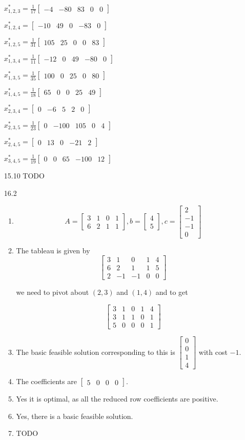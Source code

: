 \documentclass[10pt,a4paper]{article}
\newcommand\m[1]{\begin{bmatrix}#1\end{bmatrix}}
\begin{document}
\begin{enumerate}
        $ x^*_{1, 2, 3} = \frac{1}{17}\m{-4 & -80 & 83 & 0 & 0 }$

        $ x^*_{1, 2, 4} = \m{-10 & 49 & 0 & -83 & 0 }$

        $ x^*_{1, 2, 5} = \frac{1}{31}\m{105 & 25 & 0 & 0 & 83 }$

        $ x^*_{1, 3, 4} = \frac{1}{11}\m{-12 & 0 & 49 & -80 & 0 }$

        $ x^*_{1, 3, 5} = \frac{1}{35}\m{100 & 0 & 25 & 0 & 80 }$

        $ x^*_{1, 4, 5} = \frac{1}{18}\m{65 & 0 & 0 & 25 & 49 }$

        $ x^*_{2, 3, 4} = \m{0 & -6 & 5 & 2 & 0 }$

        $ x^*_{2, 3, 5} = \frac{1}{23}\m{0 & -100 & 105 & 0 & 4 }$

        $ x^*_{2, 4, 5} = \m{0 & 13 & 0 & -21 & 2 }$

        $ x^*_{3, 4, 5} = \frac{1}{19}\m{0 & 0 & 65 & -100 & 12 }$


    \item [15.10] TODO
    
    \item [16.2] \begin{enumerate}
        \item $$A= \m{3 & 1 & 0 &1  \\ 6 &2 &1&1}, b = \m{4 \\5}, c = \m{2 \\-1 \\-1 \\0 }$$
        \item The tableau is given by 
        $$ \m{ 3 & 1 & 0 & 1 & 4\\ 6 & 2 &1 & 1 & 5 \\ 2 & -1 & -1 &0 &0}$$

        we need to pivot about $(2, 3)$ and $(1, 4)$ and to get 

        $$ \m{ 3 & 1 & 0 & 1 & 4\\ 3 & 1 &1 & 0 & 1 \\ 5 & 0 & 0 &0 &1}$$

        \item  The basic feasible solution corresponding to this is $\m{0 \\ 0 \\ 1 \\ 4}$ with cost $-1$.
        \item The coefficients are $\m{5 & 0 & 0 & 0 }$.
        \item Yes it is optimal, as all the reduced row coefficients are positive.
        \item Yes, there is a basic feasible solution. 
        \item TODO



\end{enumerate}
\end{enumerate}
\end{document}
